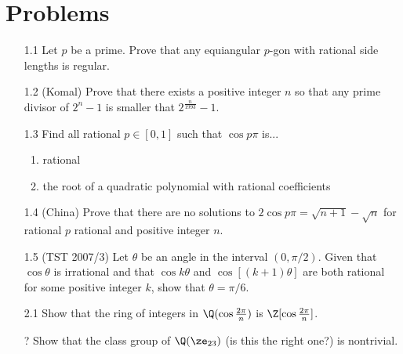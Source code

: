 \section{Problems}
\begin{enumerate}
\item[1.1] Let $p$ be a prime. Prove that any equiangular $p$-gon with rational side lengths is regular.

\item[1.2] (Komal) Prove that there exists a positive integer $n$ so that any prime divisor of $2^n-1$ is smaller that $2^{\frac{n}{1993}}-1$.

\item[1.3] Find all rational $p\in [0,1]$ such that $\cos p\pi$ is...
\begin{enumerate}
\item rational
\item the root of a quadratic polynomial with rational coefficients
\end{enumerate}

\item[1.4] (China) Prove that there are no solutions to $2\cos p\pi=\sqrt{n+1}-\sqrt{n}$ for rational $p$ rational and positive integer $n$.

\item[1.5] (TST 2007/3) Let $\theta$ be an angle in the interval $(0,\pi/2)$. Given that $\cos \theta$ is irrational and that $\cos k\theta$ and $\cos[(k+1)\theta]$ are both rational for some positive integer $k$, show that $\theta=\pi/6$.


\item[2.1] Show that the ring of integers in $\Q(\cos\frac{2\pi}{n})$ is $\Z[\cos\frac{2\pi}{n}]$.
\item[?] Show that the class group of $\Q(\ze_{23})$ (is this the right one?) is nontrivial.
\end{enumerate}
